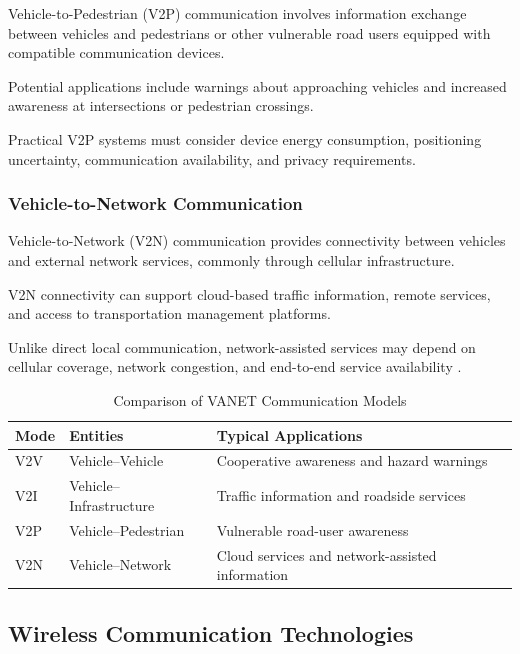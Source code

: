 Vehicle-to-Pedestrian (V2P)
communication involves information
exchange between vehicles and
pedestrians or other vulnerable
road users equipped with
compatible communication devices.

Potential applications include
warnings about approaching
vehicles and increased awareness
at intersections or pedestrian
crossings.

Practical V2P systems must
consider device energy consumption,
positioning uncertainty,
communication availability,
and privacy requirements.

\subsubsection{Vehicle-to-Network Communication}

Vehicle-to-Network (V2N)
communication provides connectivity
between vehicles and external
network services, commonly through
cellular infrastructure.

V2N connectivity can support
cloud-based traffic information,
remote services, and access
to transportation management
platforms.

Unlike direct local communication,
network-assisted services may
depend on cellular coverage,
network congestion, and
end-to-end service availability
\cite{Karagiannis2011}.

\begin{table}[htbp]
\centering
\caption{Comparison of VANET Communication Models}
\label{tab:communication_models}
\footnotesize
\begin{tabular}{|p{1.0cm}|p{2.0cm}|p{3.4cm}|}
\hline
\textbf{Mode} &
\textbf{Entities} &
\textbf{Typical Applications} \\
\hline
V2V &
Vehicle--Vehicle &
Cooperative awareness and hazard warnings \\
\hline
V2I &
Vehicle--Infrastructure &
Traffic information and roadside services \\
\hline
V2P &
Vehicle--Pedestrian &
Vulnerable road-user awareness \\
\hline
V2N &
Vehicle--Network &
Cloud services and network-assisted information \\
\hline
\end{tabular}
\end{table}

\subsection{Wireless Communication Technologies}
\label{sec:2C}

